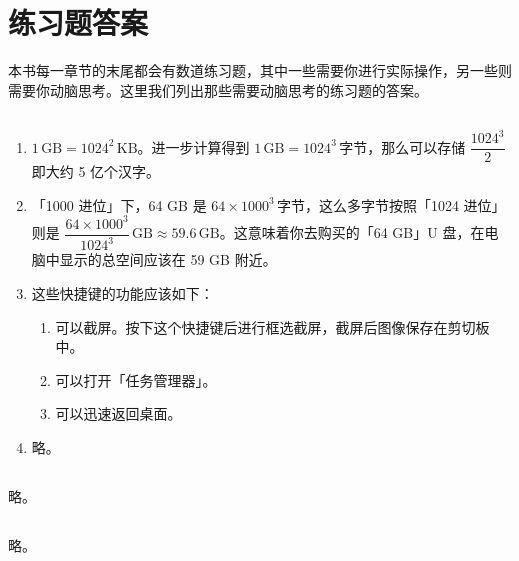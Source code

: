 \chapter{练习题答案}
\label{cha:answers}
\fancyhead[OL]{\bfseries\nouppercase\rightmark}
\setcounter{section}{-1}

本书每一章节的末尾都会有数道练习题，其中一些需要你进行实际操作，另一些则需要你动脑思考。这里我们列出那些需要动脑思考的练习题的答案。

\section{}

\begin{enumerate}
  \item $1\,\mathrm{GB}=1024^2\,\mathrm{KB}$。进一步计算得到 $1\,\mathrm{GB}=1024^3\,\text{字节}$，那么可以存储 $\dfrac{1024^3}{2}$ 即大约 5 亿个汉字。
  \item 「1000 进位」下，64 GB 是 $64\times1000^3\,\text{字节}$，这么多字节按照「1024 进位」则是 $\dfrac{64\times1000^3}{1024^3}\,\mathrm{GB}\approx59.6\,\mathrm{GB}$。这意味着你去购买的「64 GB」U 盘，在电脑中显示的总空间应该在 59 GB 附近。
  \item 这些快捷键的功能应该如下：
  \begin{enumerate}
    \item 可以截屏。按下这个快捷键后进行框选截屏，截屏后图像保存在剪切板中。
    \item 可以打开「任务管理器」。
    \item 可以迅速返回桌面。
  \end{enumerate}
  \item 略。
\end{enumerate}

\section{}

略。

\section{}

略。

\section{}

